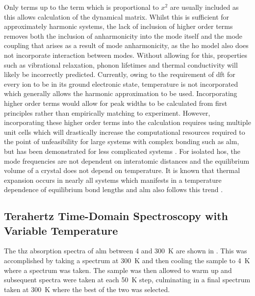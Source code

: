Only terms up to the term which is proportional to \(x^2\) are usually included as this allows calculation of the dynamical matrix. Whilst this is sufficient for approximately harmonic systems, the lack of inclusion of higher order terms removes both the inclusion of anharmonicity into the mode itself and the mode coupling that arises as a result of mode anharmonicity, as the \acrshort{ho} model also does not incorporate interaction between modes. Without allowing for this, properties such as vibrational relaxation, phonon lifetimes and thermal conductivity will likely be incorrectly predicted. Currently, owing to the requirement of \acrshort{dft} for every ion to be in its ground electronic state, temperature is not incorporated which generally allows the harmonic approximation to be used. Incorporating higher order terms would allow for peak widths to be calculated from first principles rather than empirically matching to experiment. However, incorporating these higher order terms into the calculation requires using multiple unit cells which will drastically increase the computational resources required to the point of unfeasibility for large systems with complex bonding such as \acrshort{alm}, but has been demonstrated for less complicated systems \cite{Erba2019}. For isolated \acrshort{ho}s, the mode frequencies are not dependent on interatomic distances and the equilibrium volume of a crystal does not depend on temperature. It is known that thermal expansion occurs in nearly all systems which manifests in a temperature dependence of equilibrium bond lengths and \acrshort{alm} also follows this trend \cite{Smith2005, Schreyer2014}. 

\subsection{Terahertz Time-Domain Spectroscopy with Variable Temperature}
The \acrshort{thz} absorption spectra of \acrshort{alm} between 4 and \SI{300}{K} are shown in . This was accomplished by taking a spectrum at \SI{300}{K} and then cooling the sample to \SI{4}{K} where a spectrum was taken. The sample was then allowed to warm up and subsequent spectra were taken at each \SI{50}{K} step, culminating in a final spectrum taken at \SI{300}{K} where the best of the two was selected.

